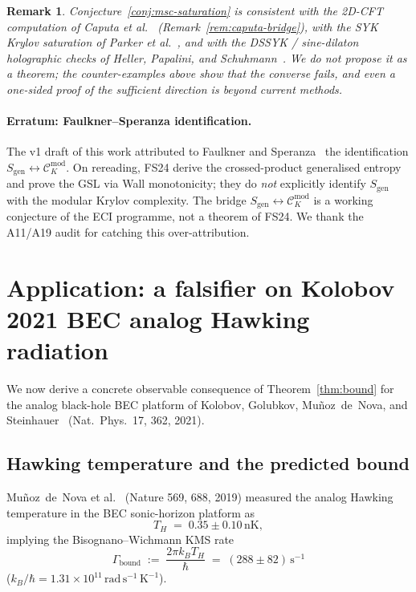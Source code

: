 \documentclass[12pt,a4paper]{article}
\newtheorem{remark}{Remark}
\begin{document}
\begin{remark}
Conjecture~\ref{conj:msc-saturation} is consistent with the
2D-CFT computation of Caputa et al.~\cite{Caputa2024}
(Remark~\ref{rem:caputa-bridge}), with the SYK Krylov saturation
of Parker et al.~\cite{Parker2019}, and with the DSSYK / sine-dilaton
holographic checks of Heller, Papalini, and
Schuhmann~\cite{HellerPapalini2024}.
We do not propose it as a theorem; the counter-examples above
show that the converse fails, and even a one-sided proof of the
sufficient direction is beyond current methods.
\end{remark}

\paragraph{Erratum: Faulkner--Speranza identification.}
The v1 draft of this work attributed to Faulkner and
Speranza~\cite{FaulknerSperanza2024} the identification
$S_{\mathrm{gen}} \leftrightarrow \mathcal{C}_K^{\mathrm{mod}}$.
On rereading, FS24 derive the crossed-product generalised entropy
and prove the GSL via Wall monotonicity; they do \emph{not}
explicitly identify $S_{\mathrm{gen}}$ with the modular Krylov
complexity.
The bridge $S_{\mathrm{gen}} \leftrightarrow \mathcal{C}_K^{\mathrm{mod}}$
is a working conjecture of the ECI programme, not a theorem of FS24.
We thank the A11/A19 audit for catching this over-attribution.

\section{Application: a falsifier on Kolobov 2021 BEC analog Hawking
         radiation}
\label{sec:bec}

We now derive a concrete observable consequence of
Theorem~\ref{thm:bound} for the analog black-hole BEC platform of
Kolobov, Golubkov, Mu\~{n}oz~de~Nova, and Steinhauer~\cite{Kolobov2021}
(Nat.~Phys.~17, 362, 2021).

\subsection{Hawking temperature and the predicted bound}

Mu\~{n}oz~de~Nova et al.~\cite{Steinhauer2019} (Nature 569, 688, 2019)
measured the analog Hawking temperature in the BEC sonic-horizon
platform as
\begin{equation}
  T_H \;=\; 0.35 \pm 0.10\,\mathrm{nK},
\end{equation}
implying the Bisognano--Wichmann KMS rate
\begin{equation}
  \boxed{\;
  \Gamma_{\mathrm{bound}}
  \;:=\;
  \frac{2\pi k_B T_H}{\hbar}
  \;=\;
  (288 \pm 82)\,\mathrm{s}^{-1}
  \;}
  \label{eq:gamma-bound}
\end{equation}
($k_B/\hbar = 1.31 \times 10^{11}\,\mathrm{rad}\,\mathrm{s}^{-1}\,\mathrm{K}^{-1}$).
\end{document}
